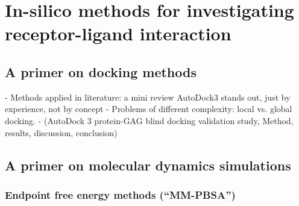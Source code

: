 \chapter{In-silico methods for investigating receptor-ligand interaction}

\section{A primer on docking methods}


    - Methods applied in literature: a mini review
        AutoDock3 stands out, just by experience, not by concept
    - Problems of different complexity: local vs. global docking.
    - (AutoDock 3 protein-GAG blind docking validation study,
        Method, results, discussion, conclusion)

\lipsum[1-5]

\section{A primer on molecular dynamics simulations}

\lipsum[1-5]

\subsection{Endpoint free energy methods (\enquote{MM-PBSA})}
\label{methods:mmpbsa_mmgbsa}

\lipsum[1-5]